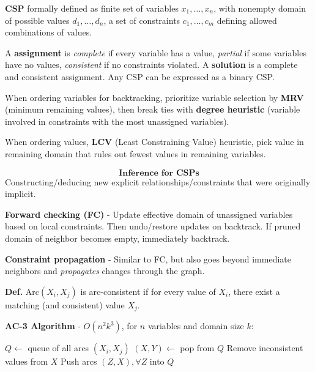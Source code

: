\documentclass[a4paper,10pt,twocolumn]{article}
\begin{document}
\begin{tcolorbox}[title=Constraint Satisfaction, module]
    \textbf{CSP} formally defined as finite set of variables $x_1, \ldots, x_n$, with nonempty domain of possible values $d_1, \ldots, d_n$, a set of constraints $c_1, \ldots, c_m$ defining allowed combinations of values.

    A \textbf{assignment} is \textit{complete} if every variable has a value, \textit{partial} if some variables have no values, \textit{consistent} if no constraints violated. A \textbf{solution} is a complete and consistent assignment. Any CSP can be expressed as a binary CSP.

    When ordering variables for backtracking, prioritize variable selection by \textbf{MRV} (minimum remaining values), then break ties with \textbf{degree heuristic} (variable involved in constraints with the most unassigned variables).

    When ordering values, \textbf{LCV} (Least Constraining Value) heuristic, pick value in remaining domain that rules out fewest values in remaining variables.

    \vspace{-1em}
    \[\textbf{Inference for CSPs}\]
    Constructing/deducing new explicit relationships/constraints that were originally implicit.

    \textbf{Forward checking (FC)} - Update effective domain of unassigned variables based on local constraints. Then undo/restore updates on backtrack. If pruned domain of neighbor becomes empty, immediately backtrack.

    \textbf{Constraint propagation} - Similar to FC, but also goes beyond immediate neighbors and \textit{propagates} changes through the graph.

    \textbf{Def.} $\text{Arc}(X_i, X_j)$ is arc-consistent if for every value of $X_i$, there exist a matching (and consistent) value $X_j$.

    \textbf{AC-3 Algorithm} - $O(n^2k^3)$, for $n$ variables and domain size $k$:

    \begin{algorithmic}
        \State $Q \gets$ queue of all arcs $(X_i, X_j)$ 
            \State $(X, Y) \gets$ pop from $Q$
            \State Remove inconsistent values from $X$
                \State Push arcs $(Z, X), \forall Z$ into $Q$
            \EndIf
        \EndWhile
    \end{algorithmic}


\end{tcolorbox}
\end{document}
